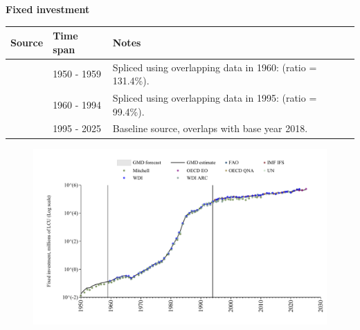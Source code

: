 \documentclass[12pt,a4paper,landscape]{article}
\begin{document}
\begin{adjustbox}{max totalsize={\paperwidth}{\paperheight},center}
\begin{minipage}[t][\textheight][t]{\textwidth}
\vspace*{0.5cm}
{}
\begin{center}
{\Large\bfseries Fixed investment}
\end{center}
\vspace{0.5cm}
\begin{table}[H]
\centering
\small
\begin{tabular}{|l|l|l|}
\hline
\textbf{Source} & \textbf{Time span} & \textbf{Notes} \\
\hline
\rowcolor{white}\cite{Mitchell}& 1950 - 1959 &Spliced using overlapping data in 1960: (ratio = 131.4\%). \\
\rowcolor{lightgray}\cite{WDI}& 1960 - 1994 &Spliced using overlapping data in 1995: (ratio = 99.4\%). \\
\rowcolor{white}\cite{OECD_EO}& 1995 - 2025 &Baseline source, overlaps with base year 2018. \\
\hline
\end{tabular}
\end{table}
\begin{figure}[H]
\centering
\includegraphics[width=\textwidth,height=0.6\textheight,keepaspectratio]{graphs/ISR_finv.pdf}
\end{figure}
\end{minipage}
\end{adjustbox}
\end{document}
